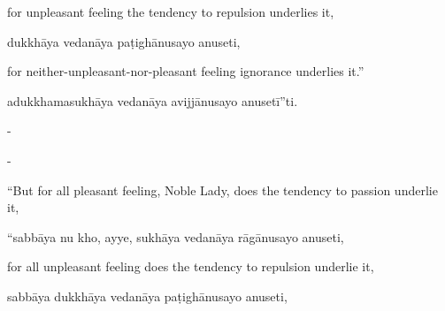 \begin{samepage}
\begin{leftcolumn*}
for unpleasant feeling the tendency to repulsion underlies it,
\end{leftcolumn*}

\begin{rightcolumn}
dukkhāya vedanāya paṭighānusayo anuseti,
\end{rightcolumn}
\end{samepage}

\begin{samepage}
\begin{leftcolumn*}
for neither-unpleasant-nor-pleasant feeling ignorance underlies it.”
\end{leftcolumn*}

\begin{rightcolumn}
adukkhamasukhāya vedanāya avijjānusayo anusetī”ti.
\end{rightcolumn}
\end{samepage}

\begin{samepage}
\begin{leftcolumn*}
-
\end{leftcolumn*}

\begin{rightcolumn}
-
\end{rightcolumn}
\end{samepage}

\begin{samepage}
\begin{leftcolumn*}
“But for all pleasant feeling, Noble Lady, does the tendency to passion underlie it,
\end{leftcolumn*}

\begin{rightcolumn}
“sabbāya nu kho, ayye, sukhāya vedanāya rāgānusayo anuseti,
\end{rightcolumn}
\end{samepage}

\begin{samepage}
\begin{leftcolumn*}
for all unpleasant feeling does the tendency to repulsion underlie it,
\end{leftcolumn*}

\begin{rightcolumn}
sabbāya dukkhāya vedanāya paṭighānusayo anuseti,
\end{rightcolumn}
\end{samepage}

